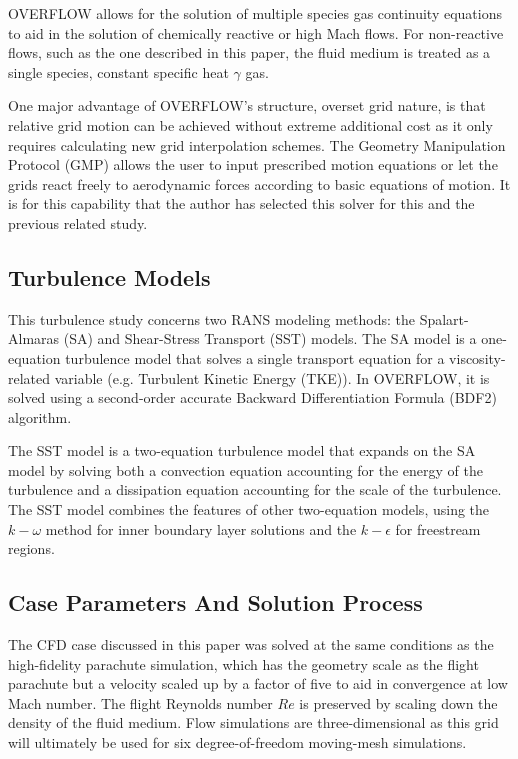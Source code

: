 \documentclass[]{aiaa-tc}%
\begin{document}
OVERFLOW allows for the solution of multiple species gas continuity equations to aid in the solution of chemically reactive or high Mach flows.  For non-reactive flows, such as the one described in this paper, the fluid medium is treated as a single species, constant specific heat $\gamma$ gas.

One major advantage of OVERFLOW's structure, overset grid nature, is that relative grid motion can be achieved without extreme additional cost as it only requires calculating new grid interpolation schemes. \cite{gmp}  The Geometry Manipulation Protocol (GMP) allows the user to input prescribed motion equations or let the grids react freely to aerodynamic forces according to basic equations of motion.  It is for this capability that the author has selected this solver for this and the previous related study.


\subsection{Turbulence Models}

This turbulence study concerns two RANS modeling methods: the Spalart-Almaras (SA) and Shear-Stress Transport (SST) models.  The SA model is a one-equation turbulence model that solves a single transport equation for a viscosity-related variable (e.g. Turbulent Kinetic Energy (TKE)).\cite{SAmodel} In OVERFLOW, it is solved using a second-order accurate Backward Differentiation Formula (BDF2) algorithm.

The SST model is a two-equation turbulence model that expands on the SA model by solving both a convection equation accounting for the energy of the turbulence and a dissipation equation accounting for the scale of the turbulence. \cite{menter_sst}  The SST model combines the features of other two-equation models, using the $k-\omega$ method for inner boundary layer solutions and the $k-\epsilon$ for freestream regions.


\subsection{Case Parameters And Solution Process}

The CFD case discussed in this paper was solved at the same conditions as the high-fidelity parachute simulation, which has the geometry scale as the flight parachute but a velocity scaled up by a factor of five to aid in convergence at low Mach number.  The flight Reynolds number $Re$ is preserved by scaling down the density of the fluid medium.  Flow simulations are three-dimensional as this grid will ultimately be used for six degree-of-freedom moving-mesh simulations.
\end{document}
